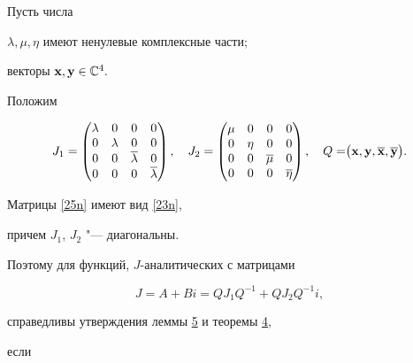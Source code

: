  \begin{example}[2]Пусть числа

 $\lambda,\mu,\eta$ имеют ненулевые комплексные части;

 векторы $\bold x,\bold y\in\mathbb{C}^4.$

   Положим

\begin{equation}

J_1=

\begin{pmatrix}

\lambda&0&0&0\\

0&\lambda&0&0\\

0&0&\overline{\lambda}&0\\

0&0&0&\overline{\lambda}

\end{pmatrix},\quad

J_2=\begin{pmatrix}

\mu&0&0&0\\

0&\eta&0&0\\

0&0&\overline{\mu}&0\\

0&0&0&\overline{\eta}

\end{pmatrix},\quad

Q=\bigr(\bold x,\bold y,\overline{\bold x},\overline{\bold y}\bigr).

\label{25n}

\end{equation}

\end{example}



Матрицы   \eqref{25n}   имеют вид \eqref{23n},

причем $J_1$, $J_2$ "--- диагональны.

Поэтому для  функций, $J$-аналитических с матрицами

$$

J=A+Bi=QJ_1Q^{-1}+QJ_2Q^{-1}i,

$$

справедливы утверждения  леммы \hyperlink{nik:lemma5}{5} и теоремы \hyperlink{nik:th4}{4},

если

